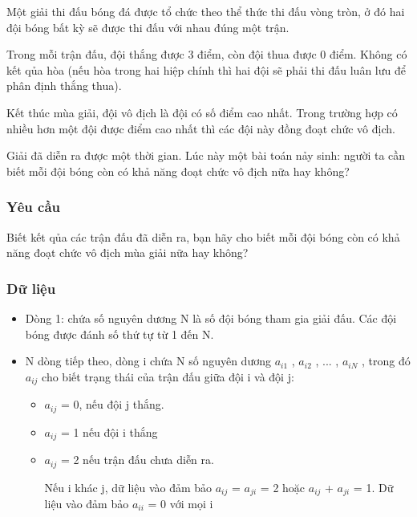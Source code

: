 



   Một giải thi đấu bóng đá được tổ chức theo thể thức thi đấu vòng tròn, ở đó hai đội bóng bất kỳ sẽ được thi đấu với nhau đúng một trận.  

   Trong mỗi trận đấu, đội thắng được 3 điểm, còn đội thua được 0 điểm. Không có kết qủa hòa (nếu hòa trong hai hiệp chính thì hai đội sẽ phải thi đấu luân lưu để phân định thắng thua).  

   Kết thúc mùa giải, đội vô địch là đội có số điểm cao nhất. Trong trường hợp có nhiều hơn một đội được điểm cao nhất thì các đội này đồng đoạt chức vô địch.  

   Giải đã diễn ra được một thời gian. Lúc này một bài toán nảy sinh: người ta cần biết mỗi đội bóng còn có khả năng đoạt chức vô địch nữa hay không?  

\subsubsection{   Yêu cầu  }

   Biết kết qủa các trận đấu đã diễn ra, bạn hãy cho biết mỗi đội bóng còn có khả năng đoạt chức vô địch mùa giải nữa hay không?  

\subsubsection{   Dữ liệu  }
\begin{itemize}
	\item     Dòng 1: chứa số nguyên dương N là số đội bóng tham gia giải đấu. Các đội bóng được đánh số thứ tự từ 1 đến N.   
	\item     N dòng tiếp theo, dòng i chứa N số nguyên dương $a_{i1}$    , $a_{i2}$    , ... , $a_{iN}$    , trong đó $a_{ij}$    cho biết trạng thái của trận đấu giữa đội i và đội j:    
\begin{itemize}
	\item       $a_{ij}$      = 0, nếu đội j thắng.     
	\item       $a_{ij}$      = 1 nếu đội i thắng     
	\item       $a_{ij}$      = 2 nếu trận đấu chưa diễn ra.      

       Nếu i khác j, dữ liệu vào đảm bảo $a_{ij}$       = $a_{ji}$       = 2 hoặc $a_{ij}$       + $a_{ji}$       = 1. Dữ liệu vào đảm bảo $a_{ii}$       = 0 với mọi i      
\end{itemize}
\end{itemize}

